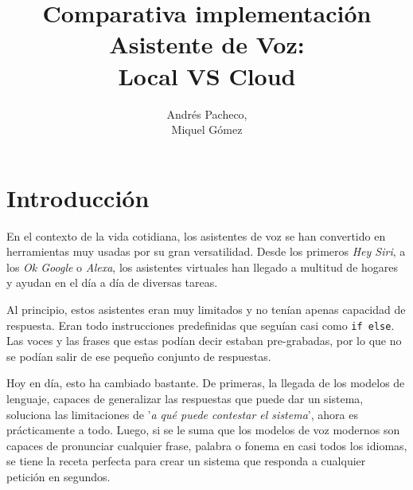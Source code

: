 \documentclass[11pt,spanish,listoffigures,listoftables]{tfgetsinf}
\title{Comparativa implementación Asistente de Voz: \\Local VS Cloud}
\author{Andrés Pacheco, \\ Miquel Gómez}
\begin{document}
 







\mainmatter

\chapter{Introducción}

En el contexto de la vida cotidiana, los asistentes de voz se han convertido en herramientas muy usadas por su gran versatilidad. Desde los primeros \textit{Hey Siri}, a los \textit{Ok Google} o \textit{Alexa}, los asistentes virtuales han llegado a multitud de hogares y ayudan en el día a día de diversas tareas.

Al principio, estos asistentes eran muy limitados y no tenían apenas capacidad de respuesta. Eran todo instrucciones predefinidas que seguían casi como \texttt{if else}. Las voces y las frases que estas podían decir estaban pre-grabadas, por lo que no se podían salir de ese pequeño conjunto de respuestas. 

Hoy en día, esto ha cambiado bastante. De primeras, la llegada de los modelos de lenguaje, capaces de generalizar las respuestas que puede dar un sistema, soluciona las limitaciones de '\textit{a qué puede contestar el sistema}', ahora es prácticamente a todo. Luego, si se le suma que los modelos de voz modernos son capaces de pronunciar cualquier frase, palabra o fonema en casi todos los idiomas, se tiene la receta perfecta para crear un sistema que responda a cualquier petición en segundos.
\end{document}
